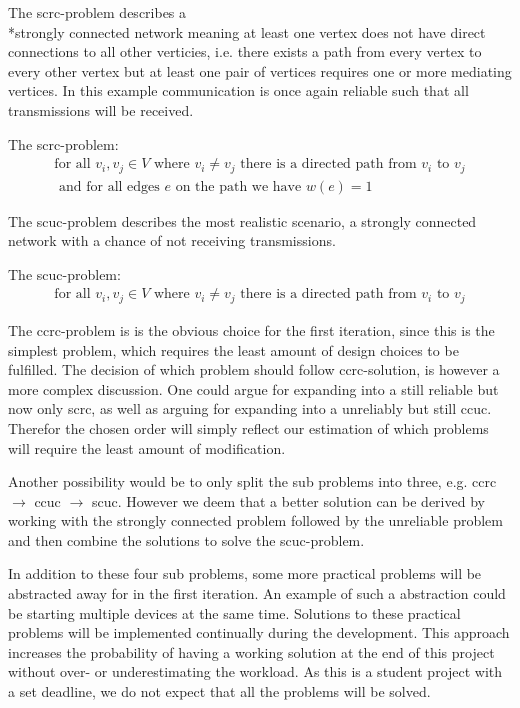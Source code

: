 \noindent The \gls{scrc}-problem describes a \\*strongly connected network meaning at least one vertex does not have direct connections to all other verticies, i.e. there exists a path from every vertex to every other vertex but at least one pair of vertices requires one or more mediating vertices. 
In this example communication is once again reliable such that all transmissions will be received. 

\begin{definition}
	The \acrshort{scrc}-problem:
	\begin{align*}
		\text{for all } v_i, v_j \in V \text{ where } v_i \neq v_j \text{ there is a directed path from } v_i \text{ to } v_j\\
		\text{ and for all edges } e \text{ on the path we have } w(e) = 1
	\end{align*}
\end{definition}

\noindent The \gls{scuc}-problem describes the most realistic scenario, a strongly connected network with a chance of not receiving transmissions. 

\begin{definition}\label{SCUC}
	The \acrshort{scuc}-problem:
	\begin{align*}
		\text{for all } v_i, v_j \in V \text{ where } v_i \neq v_j \text{ there is a directed path from } v_i \text{ to } v_j%
	\end{align*}
\end{definition}

\bigskip 
\noindent
The \gls{ccrc}-problem is is the obvious choice for the first iteration, since this is the simplest problem, which requires the least amount of design choices to be fulfilled.
The decision of which problem should follow \gls{ccrc}-solution, is however a more complex discussion.
One could argue for expanding into a still reliable but now only \acrlong{scrc}, as well as arguing for expanding into a unreliably but still \acrlong{ccuc}.
Therefor the chosen order will simply reflect our estimation of which problems will require the least amount of modification.

Another possibility would be to only split the sub problems into three, e.g. \gls{ccrc} $\rightarrow$ \gls{ccuc} $\rightarrow$ \gls{scuc}.
However we deem that a better solution can be derived by working with the strongly connected problem followed by the unreliable problem and then combine the solutions to solve the \gls{scuc}-problem.

In addition to these four sub problems, some more practical problems will be abstracted away for in the first iteration.
An example of such a abstraction could be starting multiple devices at the same time.
Solutions to these practical problems will be implemented continually during the development. 
This approach increases the probability of having a working solution at the end of this project without over- or underestimating the workload. 
As this is a student project with a set deadline, we do not expect that all the problems will be solved.

